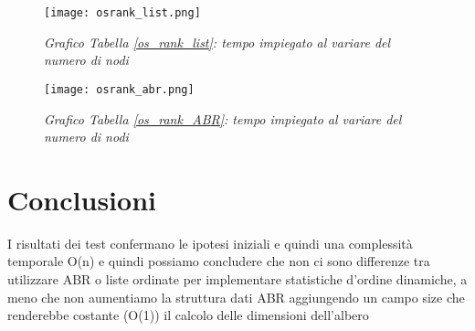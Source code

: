 \documentclass{article}
\begin{document}
\begin{figure}[H]
    \begin{minipage}{.5\linewidth}
      \centering
            \texttt{[image: osrank\_list.png]}
      \caption{\textit{Grafico Tabella \ref{os_rank_list}: tempo impiegato al variare del numero di nodi}}
      \label{rank_listgra}
    \end{minipage}%
    \hspace{10pt}
    \begin{minipage}{.5\linewidth}
      \centering
            \texttt{[image: osrank\_abr.png]}
        \caption{\textit{Grafico Tabella \ref{os_rank_ABR}: tempo impiegato al variare del numero di nodi}}
        \label{rank_abrgra}
    \end{minipage} 
\end{figure}

\section{Conclusioni}
I risultati dei test confermano le ipotesi iniziali e quindi una complessità temporale O(n) e quindi possiamo concludere che non ci sono differenze tra utilizzare ABR o liste ordinate per implementare statistiche d'ordine dinamiche, a meno che non aumentiamo la struttura dati ABR aggiungendo un campo size che renderebbe costante (O(1)) il calcolo delle dimensioni dell'albero
\end{document}
